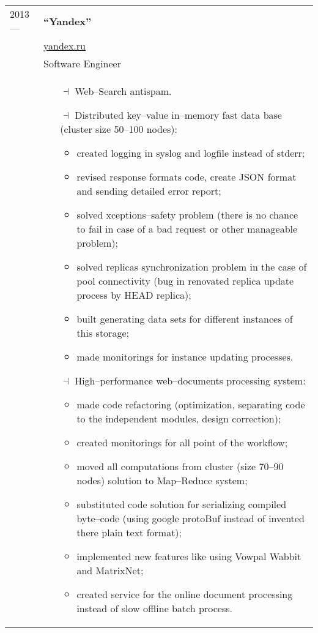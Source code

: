 \documentclass[a4paper, 10pt]{article}
\begin{document}
\begin{longtable}{p{20mm}|p{140mm}}
2013 ---
& \textbf{``Yandex''} \\
& \href{https://yandex.ru/}{yandex.ru} \\
& Software Engineer \\
& \begin{itemize}[topsep = 0pt, itemsep = 0pt]
    \item[$\dashv$] Web--Search antispam.
    \item[$\dashv$] Distributed key--value in--memory fast data base (cluster size 50--100 nodes):
        \begin{itemize}[topsep = 0pt, itemsep = 0pt]
            \item created logging in syslog and logfile instead of stderr;
            \item revised response formats code, create JSON format and sending detailed error report;
            \item solved xceptions--safety problem (there is no chance to fail in case of a bad request or other manageable problem);
            \item solved replicas synchronization problem in the case of pool connectivity (bug in renovated replica update process by HEAD replica);
            \item built generating data sets for different instances of this storage;
            \item made monitorings for instance updating processes.
        \end{itemize}
    \item[$\dashv$] High--performance web--documents processing system:
        \begin{itemize}[topsep = 0pt, itemsep = 0pt]
            \item made code refactoring (optimization, separating code to the independent modules, design correction);
            \item created monitorings for all point of the workflow;
            \item moved all computations from cluster (size 70--90 nodes) solution to Map--Reduce system;
            \item substituted code solution for serializing compiled byte--code (using google protoBuf instead of invented there plain text format);
            \item implemented new features like using Vowpal Wabbit and MatrixNet;
            \item created service for the online document processing instead of slow offline batch process.
        \end{itemize}
\end{itemize}
\\


\end{longtable}
\end{document}
